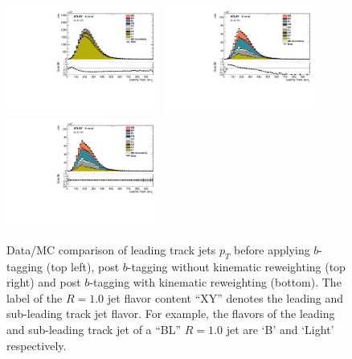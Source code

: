 \begin{figure}[htbp]
  \centering
 \includegraphics[width=0.45\textwidth]{figures/gbb/LeadTrkJet_pT_NoReweight.pdf}
 \includegraphics[width=0.45\textwidth]{figures/gbb/LeadTrkJet_pT_PreReweight.pdf}\\
 \includegraphics[width=0.45\textwidth]{figures/gbb/LeadTrkJet_pT_Reweight.pdf}
\caption{Data/MC comparison of leading track jets $p_T$ before applying $b$-tagging (top left), post $b$-tagging without kinematic reweighting (top right) and post $b$-tagging with kinematic reweighting (bottom). The label of the $R=1.0$ jet flavor content ``XY'' denotes the leading and sub-leading track jet flavor. For example, the flavors of the leading and sub-leading track jet of a ``BL'' $R=1.0$ jet are `B' and `Light' respectively.}
  \label{fig:gbb-pT_leadtrkjets}
\end{figure}


